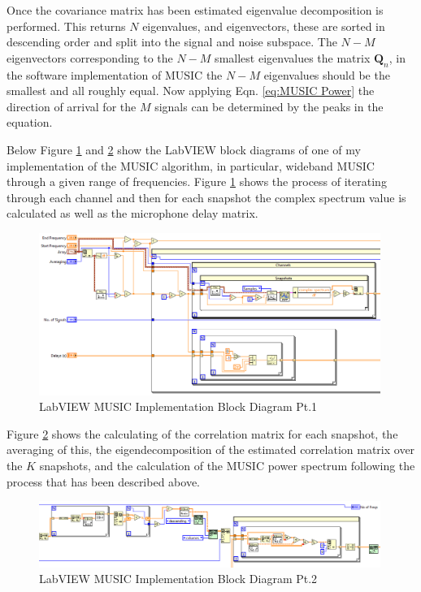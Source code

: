 \documentclass{UoNMCHA}
\numberwithin{equation}{section}
\begin{document}
    Once the covariance matrix has been estimated eigenvalue decomposition is performed. This returns $N$ eigenvalues, and eigenvectors, these are sorted in descending order and split into the signal and noise subspace. The $N-M$ eigenvectors corresponding to the $N-M$ smallest eigenvalues the matrix $\mathbf{Q}_n$, in the software implementation of MUSIC the $N-M$ eigenvalues should be the smallest and all roughly equal. Now applying Eqn. \ref{eq:MUSIC Power} the direction of arrival for the $M$ signals can be determined by the peaks in the equation. 
    
    Below Figure \ref{fig:MUSICBlockPt1} and \ref{fig:MUSICBlockPt2} show the LabVIEW block diagrams of one of my implementation of the MUSIC algorithm, in particular, wideband MUSIC through a given range of frequencies. Figure \ref{fig:MUSICBlockPt1} shows the process of iterating through each channel and then for each snapshot the complex spectrum value is calculated as well as the microphone delay matrix.
    
    \begin{figure}[H]
        \centering
        \includegraphics[keepaspectratio, width = 0.99\textwidth, frame]{Figures/MUSCBlockPt1.png}
        \caption{LabVIEW MUSIC Implementation Block Diagram Pt.1}
        \label{fig:MUSICBlockPt1}
    \end{figure}
    
    Figure \ref{fig:MUSICBlockPt2} shows the calculating of the correlation matrix for each snapshot, the averaging of this, the eigendecomposition of the estimated correlation matrix over the $K$ snapshots, and the calculation of the MUSIC power spectrum following the process that has been described above.

    \begin{figure}[H]
        \centering
        \includegraphics[keepaspectratio, width = 0.99\textwidth, frame]{Figures/MUSICBlockPt2.png}
        \caption{LabVIEW MUSIC Implementation Block Diagram Pt.2}
        \label{fig:MUSICBlockPt2}
    \end{figure}
    
\end{document}
